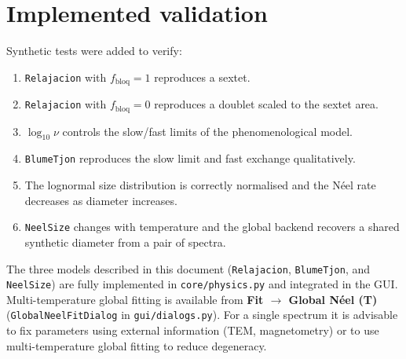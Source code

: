 \documentclass[11pt,a4paper]{article}
\newcommand{\code}[1]{\texttt{\small #1}}
\begin{document}
\section{Implemented validation}

Synthetic tests were added to verify:
\begin{enumerate}[leftmargin=*]
  \item \code{Relajacion} with $f_{\mathrm{bloq}}=1$ reproduces a sextet.
  \item \code{Relajacion} with $f_{\mathrm{bloq}}=0$ reproduces a doublet
  scaled to the sextet area.
  \item $\log_{10}\nu$ controls the slow/fast limits of the phenomenological
  model.
  \item \code{BlumeTjon} reproduces the slow limit and fast exchange
  qualitatively.
  \item The lognormal size distribution is correctly normalised and the N\'{e}el
  rate decreases as diameter increases.
  \item \code{NeelSize} changes with temperature and the global backend
  recovers a shared synthetic diameter from a pair of spectra.
\end{enumerate}

\begin{nota}[Scope — v4.9.0+]
The three models described in this document (\code{Relajacion}, \code{BlumeTjon},
and \code{NeelSize}) are fully implemented in \code{core/physics.py} and
integrated in the GUI. Multi-temperature global fitting is available from
\textbf{Fit $\to$ Global N\'{e}el (T)} (\code{GlobalNeelFitDialog} in
\code{gui/dialogs.py}). For a single spectrum it is advisable to fix parameters
using external information (TEM, magnetometry) or to use multi-temperature global
fitting to reduce degeneracy.
\end{nota}
\end{document}
